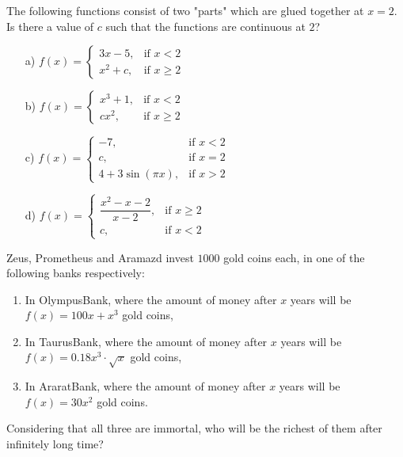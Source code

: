 \begin{problem}
The following functions consist of two "parts" which are glued together at $x=2$. Is there a value of $c$ such that the functions are continuous at 
$2$?
    \begin{enumerate}
    \item[a) ] $
f(x)=\begin{cases} 3x-5,& \text{if \(x< 2\)} \\  x^2+c,& \text{if \(x\ge2\)} \end{cases} $

        \item[b) ] $
f(x)=\begin{cases} x^3+1,& \text{if } x<2 \\  cx^2,& \text{if \(x\ge2\)} \end{cases} $ 
        
        \item[c) ] $
f(x)=\begin{cases} -7,& \text{if } x<2 \\ c,& \text{if } x=2 \\  4+3\sin(\pi x),& \text{if \(x>2\)} \end{cases} $
\bigskip
        
        \item[d) ] $
f(x)=\begin{cases} {\dfrac{x^2-x-2}{x-2}},& \text{if \(x\ge 2\)} \\  c,& \text{if \(x<2\)} \end{cases} $
        
    \end{enumerate}
\end{problem}
\medskip






\begin{problem}
Zeus, Prometheus and Aramazd  invest $1000$ gold coins each,  in one of the following banks respectively: 
\begin{enumerate}
    \item In OlympusBank, where the amount of money after $x$ years will be $f(x)=100x+x^3$ gold coins,
    \item In TaurusBank, where the amount of money after $x$ years will be $f(x)=0.18x^3\cdot \sqrt{x}$ gold coins,
    \item In AraratBank, where the amount of money after $x$ years will be $f(x)=30x^2$ gold coins.
\end{enumerate}
Considering that all three are immortal, who will be the richest of them after infinitely long time? 
\end{problem}


